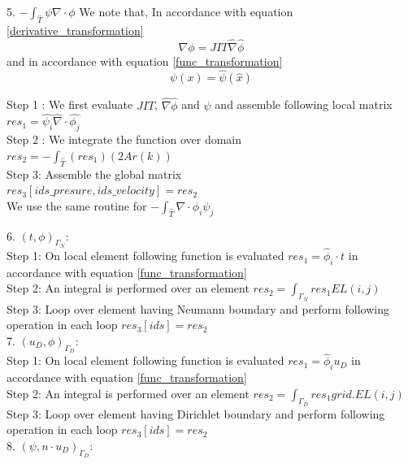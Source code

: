 \documentclass[a4paper]{book}
\begin{document}
5. $-\int_{\hat{T}} \psi \nabla \cdot \phi$
We note that, In accordance with equation \ref{derivative_transformation}
\begin{equation}
\nabla \phi = JIT \hat{\nabla} \hat{\phi}
\end{equation}
and in accordance with equation \ref{func_transformation}
\begin{equation}
\psi(x) = \hat{\psi} (\hat{x})
\end{equation}

Step 1 : We first evaluate $JIT$, $\hat{\nabla} \hat{\phi}$ and $\psi$ and assemble following local matrix\\
$res_1 = \hat{\psi_i} \hat{\nabla} \cdot \hat{\phi_j}$\\

Step 2 : We integrate the function over domain\\
$res_2 = -\int_{\hat{T}} (res_1) (2 Ar(k))$\\

Step 3: Assemble the global matrix\\
$res_3[ids\_presure,ids\_velocity] = res_2$\\

We use the same routine for $-\int_{\hat{T}} \nabla \cdot \phi_i \psi_j $

6. $(t,\phi)_{\Gamma_N}$:
\\

Step 1: On local element following function is evaluated $res_1=\hat{\phi}_i \cdot t$ in accordance with equation  \ref{func_transformation}\\
Step 2: An integral is performed over an element $res_2=\int_{\Gamma_N} res_1 EL(i,j) $\\
Step 3: Loop over element having Neumann boundary and perform following operation in each loop $res_3[ids]=res_2$\\

7. $(u_D,\phi)_{\Gamma_D}$:
\\
Step 1: On local element following function is evaluated $res_1=\hat{\phi}_i u_D$ in accordance with equation \ref{func_transformation}\\
Step 2: An integral is performed over an element $res_2=\int_{\Gamma_D} res_1 grid.EL(i,j) $\\
Step 3: Loop over element having Dirichlet boundary and perform following operation in each loop $res_3[ids]=res_2$\\

8. $(\psi, n \cdot u_D)_{\Gamma_D} $:
\end{document}
